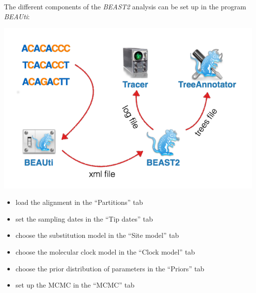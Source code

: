 \documentclass[
  letterpaper,
]{book}
\providecommand{\tightlist}{%
  \setlength{\itemsep}{0pt}\setlength{\parskip}{0pt}}\usepackage{longtable,booktabs,array}
\begin{document}
The different components of the \emph{BEAST2} analysis can be set up in
the program \emph{BEAUti}:

\includegraphics{assets/images/chapters/phylogenomics/26.png}

\begin{itemize}
\tightlist
\item
  load the alignment in the ``Partitions'' tab
\item
  set the sampling dates in the ``Tip dates'' tab
\item
  choose the substitution model in the ``Site model'' tab
\item
  choose the molecular clock model in the ``Clock model'' tab
\item
  choose the prior distribution of parameters in the ``Priors'' tab
\item
  set up the MCMC in the ``MCMC'' tab
\end{itemize}
\end{document}
